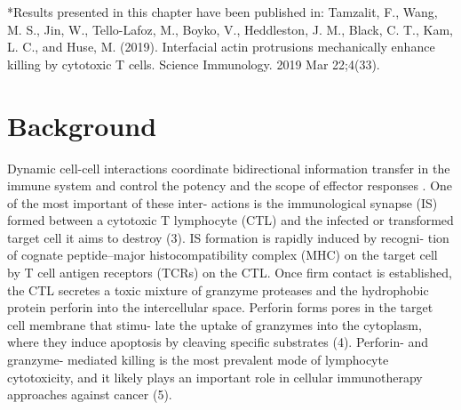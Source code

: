 *Results presented in this chapter have been published in: Tamzalit, F., Wang, M. S., Jin, W., Tello-Lafoz, M., Boyko, V., Heddleston, J. M., Black, C. T., Kam, L. C., and Huse, M. (2019). Interfacial actin protrusions mechanically enhance killing by cytotoxic T cells. Science Immunology. 2019 Mar 22;4(33).

\section{Background}
Dynamic cell-cell interactions coordinate bidirectional information transfer in the immune system and control the potency and the scope of effector responses \cite{Batista2013}. One of the most important of these inter- actions is the immunological synapse (IS) formed between a cytotoxic T lymphocyte (CTL) and the infected or transformed target cell it aims to destroy \cite{Dustin2010} (3). IS formation is rapidly induced by recogni- tion of cognate peptide–major histocompatibility complex (MHC) on the target cell by T cell antigen receptors (TCRs) on the CTL. Once firm contact is established, the CTL secretes a toxic mixture of granzyme proteases and the hydrophobic protein perforin into the intercellular space. Perforin forms pores in the target cell membrane that stimu- late the uptake of granzymes into the cytoplasm, where they induce apoptosis by cleaving specific substrates (4). Perforin- and granzyme- mediated killing is the most prevalent mode of lymphocyte cytotoxicity, and it likely plays an important role in cellular immunotherapy approaches against cancer (5).

